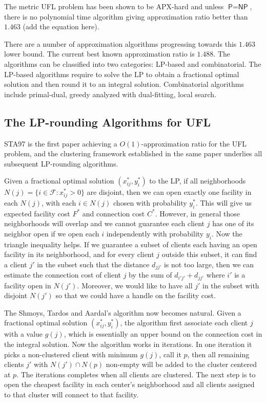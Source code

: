 \documentclass{article}
\newcommand{\fac}{\mathcal{F}}
\newcommand{\PP}{\textsf{P}}
\newcommand{\NP}{\textsf{NP}}
\newcommand{\suchthat}{:}
\begin{document}
The metric UFL problem has been shown to be APX-hard and unless $\PP
= \NP$, there is no polynomial time algorithm giving approximation
ratio better than $1.463$ (add the equation here).

There are a number of approximation algorithms progressing towards
this $1.463$ lower bound. The current best known approximation ratio
is $1.488$.  The algorithms can be classified into two categories:
LP-based and combinatorial. The LP-based algorithms require to solve
the LP to obtain a fractional optimal solution and then round it to an
integral solution. Combinatorial algorithms include primal-dual,
greedy analyzed with dual-fitting, local search.

\subsection{The LP-rounding Algorithms for UFL}
STA97 is the first paper achieving a $O(1)$-approximation ratio for
the UFL problem, and the clustering framework established in the same
paper underlies all subsequent LP-rounding algorithms.

Given a fractional optimal solution $(x_{ij}^\ast, y_i^\ast)$ to the
LP, if all neighborhoods $N(j) = \{i\in\fac \suchthat x_{ij}^\ast >
0\}$ are disjoint, then we can open exactly one facility in each
$N(j)$, with each $i\in N(j)$ chosen with probability $y_i^\ast$. This
will give us expected facility cost $F^\ast$ and connection cost
$C^\ast$.  However, in general those neighborhoods will overlap and we
cannot guarantee each client $j$ has one of its neighbor open if we
open each $i$ independently with probability $y_i$. Now the triangle
inequality helps. If we guarantee a subset of clients each having an
open facility in its neighborhood, and for every client $j$ outside
this subset, it can find a client $j'$ in the subset such that the
distance $d_{j j'}$ is not too large, then we can estimate the
connection cost of client $j$ by the sum of $d_{i' j'} + d_{j j'}$
where $i'$ is a facility open in $N(j')$. Moreover, we would like to
have all $j'$ in the subset with disjoint $N(j')$ so that we could
have a handle on the facility cost.

The Shmoys, Tardos and Aardal's algorithm now becomes natural. Given a
fractional optimal solution $(x_{ij}^\ast, y_i^\ast)$, the algorithm
first associate each client $j$ with a value $g(j)$, which is
essentially an upper bound on the connection cost in the integral
solution. Now the algorithm works in iterations. In one iteration it
picks a non-clustered client with minimum $g(j)$, call it $p$, then
all remaining clients $j'$ with $N(j')\cap N(p)$ non-empty will be
added to the cluster centered at $p$. The iterations completes when
all clients are clustered. The next step is to open the cheapest
facility in each center's neighborhood and all clients assigned to
that cluster will connect to that facility.
\end{document}
